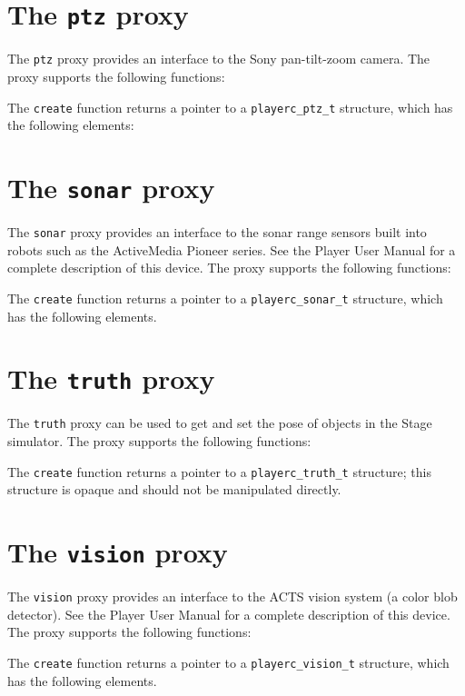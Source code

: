 \documentclass[11pt]{report}
\begin{document}
\newpage
\section{The {\tt ptz} proxy}

The {\tt ptz} proxy provides an interface to the Sony pan-tilt-zoom
camera.  The proxy supports the following
functions:
\begin{quote}

\end{quote}
The {\tt create} function returns a pointer to a {\tt playerc\_ptz\_t}
structure, which has the following elements:
\begin{quote}

\end{quote}


\newpage
\section{The {\tt sonar} proxy}

The {\tt sonar} proxy provides an interface to the sonar range sensors
built into robots such as the ActiveMedia Pioneer series.  See the
Player User Manual for a complete description of this device.  The
proxy supports the following functions:
\begin{quote}

\end{quote}
The {\tt create} function returns a pointer to a {\tt playerc\_sonar\_t}
structure, which has the following elements.
\begin{quote}

\end{quote}


\newpage
\section{The {\tt truth} proxy}

The {\tt truth} proxy can be used to get and set the pose of
objects in the Stage simulator.  The
proxy supports the following functions:
\begin{quote}

\end{quote}
The {\tt create} function returns a pointer to a {\tt playerc\_truth\_t}
structure; this structure is opaque and should not be manipulated directly.


\newpage
\section{The {\tt vision} proxy}

The {\tt vision} proxy provides an interface to the ACTS vision system
(a color blob detector).  See the Player User Manual for a complete
description of this device.  The proxy supports the following
functions:
\begin{quote}

\end{quote}
The {\tt create} function returns a pointer to a {\tt playerc\_vision\_t}
structure, which has the following elements.
\begin{quote}

\end{quote}
\end{document}
